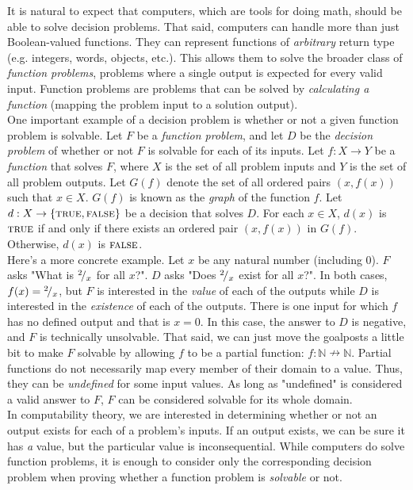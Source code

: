 It is natural to expect that computers, which are tools for doing math, should be able to solve decision problems. That said, computers can handle more than just Boolean-valued functions. They can represent functions of \textit{arbitrary} return type (e.g. integers, words, objects, etc.). This allows them to solve the broader class of \textit{function problems}, problems where a single output is expected for every valid input. Function problems are problems that can be solved by \textit{calculating a function} (mapping the problem input to a solution output). \\

One important example of a decision problem is whether or not a given function problem is solvable. Let $F$ be a \textit{function problem}, and let $D$ be the \textit{decision problem} of whether or not $F$ is solvable for each of its inputs. Let $f:X\rightarrow Y$ be a \textit{function} that solves $F$, where $X$ is the set of all problem inputs and $Y$ is the set of all problem outputs. Let $G(f)$ denote the set of all ordered pairs $(x,f(x))$ such that $x\in X$. $G(f)$ is known as the \textit{graph} of the function $f$. Let $d:X\rightarrow \{\textsc{true},\textsc{false}\}$ be a decision that solves $D$. For each $x\in X$, $d(x)$ is $\textsc{true}$ if and only if there exists an ordered pair $(x,f(x))$ in $G(f)$. Otherwise, $d(x)$ is $\textsc{false}$. \\

Here's a more concrete example. Let $x$ be any natural number (including 0). $F$ asks "What is ${}^{2}\!/_{x}$ for all $x$?". $D$ asks "Does ${}^{2}\!/_{x}$ exist for all $x$?". In both cases, $f(x)={}^{2}\!/_{x}$, but $F$ is interested in the \textit{value} of each of the outputs while $D$ is interested in the \textit{existence} of each of the outputs. There is one input for which $f$ has no defined output and that is $x=0$. In this case, the answer to $D$ is negative, and $F$ is technically unsolvable. That said, we can just move the goalposts a little bit to make $F$ solvable by allowing $f$ to be a partial function: $f:\mathbb{N}\nrightarrow \mathbb{N}$. Partial functions do not necessarily map every member of their domain to a value. Thus, they can be \textit{undefined} for some input values. As long as "undefined" is considered a valid answer to $F$, $F$ can be considered solvable for its whole domain. \\

In computability theory, we are interested in determining whether or not an output exists for each of a problem's inputs. If an output exists, we can be sure it has \textit{a} value, but the particular value is inconsequential. While computers do solve function problems, it is enough to consider only the corresponding decision problem when proving whether a function problem is \textit{solvable} or not. \\

